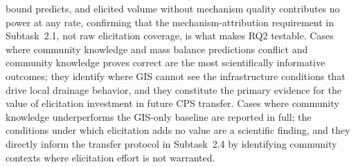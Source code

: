 \documentclass[11pt]{article}
\begin{document}
bound predicts, and elicited volume without mechanism quality contributes no
power at any rate, confirming that the mechanism-attribution requirement in
Subtask~2.1, not raw elicitation coverage, is what makes RQ2 testable.
Cases where community knowledge and mass balance predictions conflict and community
knowledge proves correct are the most scientifically informative outcomes; they
identify where GIS cannot see the infrastructure conditions that drive local
drainage behavior, and they constitute the primary evidence for the value of
elicitation investment in future CPS transfer.
Cases where community knowledge underperforms the GIS-only baseline are reported
in full; the conditions under which elicitation adds no value are a scientific
finding, and they directly inform the transfer protocol in Subtask~2.4 by
identifying community contexts where elicitation effort is not warranted.
\end{document}

